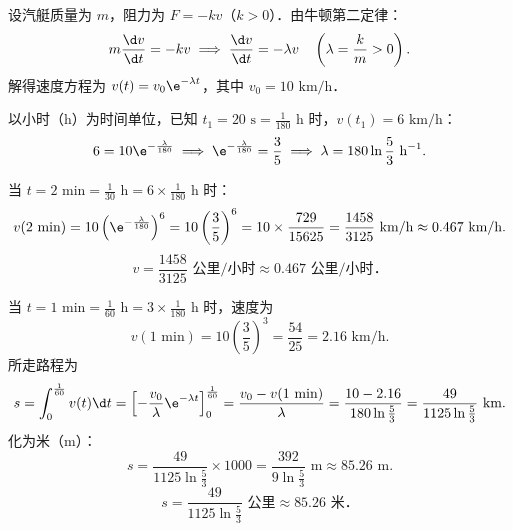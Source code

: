 \begin{solution}
    设汽艇质量为 $m$，阻力为 $F = -k v$（$k > 0$）．由牛顿第二定律：
    \begin{equation}
        m \frac{\d v}{\d t} = -kv \implies \frac{\d v}{\d t} = -\lambda v \quad \left( \lambda = \frac{k}{m} > 0 \right).
    \end{equation}
    解得速度方程为 $v(t) = v_0 \e^{-\lambda t}$，其中 $v_0 = 10\text{ km/h}$．

    以小时（$\text{h}$）为时间单位，已知 $t_1 = 20\text{ s} = \frac{1}{180}\text{ h}$ 时，$v(t_1) = 6\text{ km/h}$：
    \begin{equation}
        6 = 10 \e^{-\frac{\lambda}{180}} \implies \e^{-\frac{\lambda}{180}} = \frac{3}{5} \implies \lambda = 180\ln\frac{5}{3}\text{ h}^{-1}.
    \end{equation}


    当 $t = 2\text{ min} = \frac{1}{30}\text{ h} = 6 \times \frac{1}{180}\text{ h}$ 时：
    \begin{equation}
        v(2\text{ min}) = 10 \left( \e^{-\frac{\lambda}{180}} \right)^6 = 10 \left( \frac{3}{5} \right)^6 = 10 \times \frac{729}{15625} = \frac{1458}{3125}\text{ km/h} \approx 0.467\text{ km/h}.
    \end{equation}
    \begin{equation}
        \boxed{v = \frac{1458}{3125}\text{ 公里/小时} \approx 0.467\text{ 公里/小时}．}
    \end{equation}


    当 $t = 1\text{ min} = \frac{1}{60}\text{ h} = 3 \times \frac{1}{180}\text{ h}$ 时，速度为
    \begin{equation}
        v(1\text{ min}) = 10 \left( \frac{3}{5} \right)^3 = \frac{54}{25} = 2.16\text{ km/h}.
    \end{equation}
    所走路程为
    \begin{equation}
        s = \int_0^{\frac{1}{60}} v(t) \d t = \left[ -\frac{v_0}{\lambda}\e^{-\lambda t} \right]_0^{\frac{1}{60}} = \frac{v_0 - v(1\text{ min})}{\lambda} = \frac{10 - 2.16}{180\ln\frac{5}{3}} = \frac{49}{1125\ln\frac{5}{3}}\text{ km}.
    \end{equation}
    化为米（$\text{m}$）：
    \begin{equation}
        s = \frac{49}{1125\ln\frac{5}{3}} \times 1000 = \frac{392}{9\ln\frac{5}{3}}\text{ m} \approx 85.26\text{ m}.
    \end{equation}
    \begin{equation}
        \boxed{s = \frac{49}{1125\ln\frac{5}{3}}\text{ 公里} \approx 85.26\text{ 米}．}
    \end{equation}
\end{solution}

